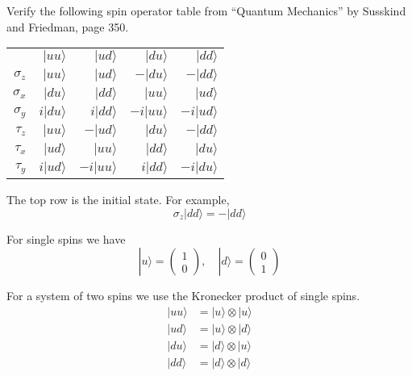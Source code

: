 \documentclass[12pt]{article}
\begin{document}
Verify the following spin operator table from ``Quantum Mechanics'' by Susskind and Friedman, page 350.

\begin{center}
\begin{tabular}{rrrrr}
& $|uu\rangle$ & $|ud\rangle$ & $|du\rangle$ & $|dd\rangle$
\\[1ex]
$\sigma_z$ & $|uu\rangle$ & $|ud\rangle$ & $-|du\rangle$ & $-|dd\rangle$
\\
$\sigma_x$ & $|du\rangle$ & $|dd\rangle$ & $|uu\rangle$ & $|ud\rangle$
\\
$\sigma_y$ & $i|du\rangle$ & $i|dd\rangle$ & $-i|uu\rangle$ & $-i|ud\rangle$
\\
$\tau_z$ & $|uu\rangle$ & $-|ud\rangle$ & $|du\rangle$ & $-|dd\rangle$
\\
$\tau_x$ & $|ud\rangle$ & $|uu\rangle$ & $|dd\rangle$ & $|du\rangle$
\\
$\tau_y$ & $i|ud\rangle$ & $-i|uu\rangle$ & $i|dd\rangle$ & $-i|du\rangle$
\end{tabular}
\end{center}

The top row is the initial state.
For example,
\begin{equation*}
\sigma_z|dd\rangle=-|dd\rangle
\end{equation*}

For single spins we have
\begin{equation*}
|u\rangle=\begin{pmatrix}1\\0\end{pmatrix},
\quad
|d\rangle=\begin{pmatrix}0\\1\end{pmatrix}
\end{equation*}

For a system of two spins we use the Kronecker product of single spins.
\begin{align*}
|uu\rangle&=|u\rangle\otimes|u\rangle
\\
|ud\rangle&=|u\rangle\otimes|d\rangle
\\
|du\rangle&=|d\rangle\otimes|u\rangle
\\
|dd\rangle&=|d\rangle\otimes|d\rangle
\end{align*}
\end{document}
